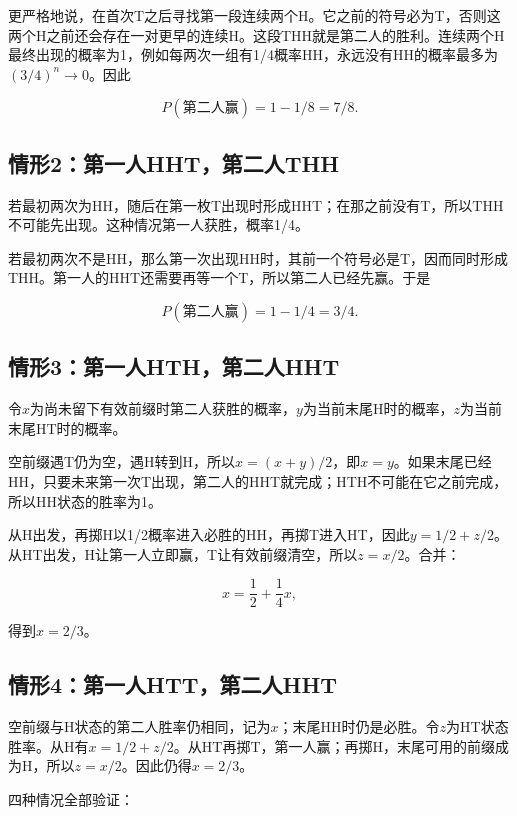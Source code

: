 \documentclass[
  11pt,
  a4paper,
  UTF8,
  fontset=fandol]{ctexart}
\begin{document}
更严格地说，在首次T之后寻找第一段连续两个H。它之前的符号必为T，否则这两个H之前还会存在一对更早的连续H。这段THH就是第二人的胜利。连续两个H最终出现的概率为1，例如每两次一组有1/4概率HH，永远没有HH的概率最多为\((3/4)^n\to0\)。因此

\[
\boxed{P(\text{第二人赢})=1-1/8=7/8.}
\]

\subsection{情形2：第一人HHT，第二人THH}\label{ux60c5ux5f622ux7b2cux4e00ux4ebahhtux7b2cux4e8cux4ebathh}

若最初两次为HH，随后在第一枚T出现时形成HHT；在那之前没有T，所以THH不可能先出现。这种情况第一人获胜，概率1/4。

若最初两次不是HH，那么第一次出现HH时，其前一个符号必是T，因而同时形成THH。第一人的HHT还需要再等一个T，所以第二人已经先赢。于是

\[
\boxed{P(\text{第二人赢})=1-1/4=3/4.}
\]

\subsection{情形3：第一人HTH，第二人HHT}\label{ux60c5ux5f623ux7b2cux4e00ux4ebahthux7b2cux4e8cux4ebahht}

令\(x\)为尚未留下有效前缀时第二人获胜的概率，\(y\)为当前末尾H时的概率，\(z\)为当前末尾HT时的概率。

空前缀遇T仍为空，遇H转到H，所以\(x=(x+y)/2\)，即\(x=y\)。如果末尾已经HH，只要未来第一次T出现，第二人的HHT就完成；HTH不可能在它之前完成，所以HH状态的胜率为1。

从H出发，再掷H以1/2概率进入必胜的HH，再掷T进入HT，因此\(y=1/2+z/2\)。从HT出发，H让第一人立即赢，T让有效前缀清空，所以\(z=x/2\)。合并：

\[
x=\frac12+\frac14x,
\]

得到\(\boxed{x=2/3}\)。

\subsection{情形4：第一人HTT，第二人HHT}\label{ux60c5ux5f624ux7b2cux4e00ux4ebahttux7b2cux4e8cux4ebahht}

空前缀与H状态的第二人胜率仍相同，记为\(x\)；末尾HH时仍是必胜。令\(z\)为HT状态胜率。从H有\(x=1/2+z/2\)。从HT再掷T，第一人赢；再掷H，末尾可用的前缀成为H，所以\(z=x/2\)。因此仍得\(\boxed{x=2/3}\)。

四种情况全部验证：
\end{document}
